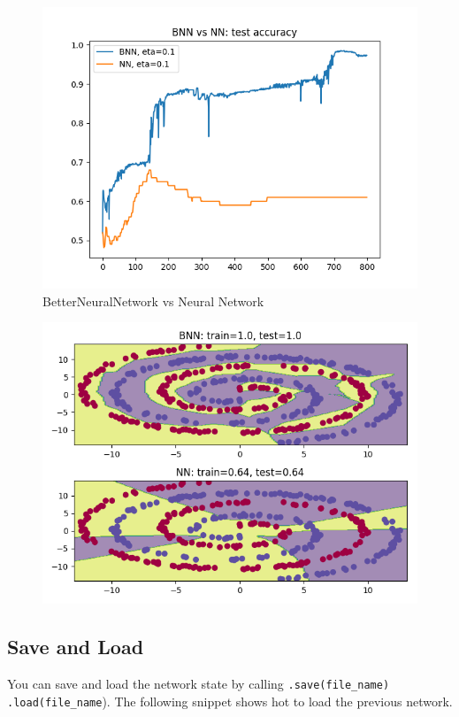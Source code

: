 \documentclass[11pt]{article}
\begin{document}
\begin{figure}[H]
\includegraphics[scale=0.5]{images/BNN_vs_NN/BNN_vs_NN_test_accuracy}
\caption{BetterNeuralNetwork vs Neural Network}
\label{fig: bnnVsNn}

\end{figure}


\begin{figure}[H]
\centering
	\includegraphics[scale=0.6]{images/BNN_vs_NN/BNN_vs_NN_boundary}
\end{figure}
\subsection{Save and Load}
You can save and load the network state by calling \texttt{.save(file\_name)} \texttt{.load(file\_name}). The following snippet shows hot to load the previous network.
\end{document}
